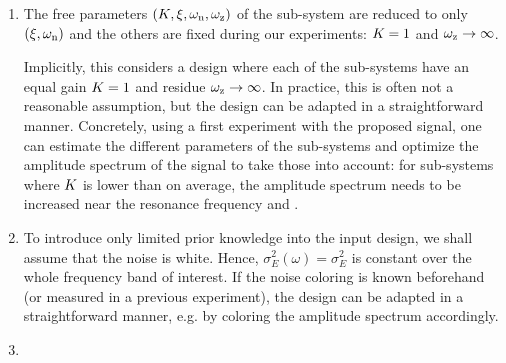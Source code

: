 \documentclass{responseletter}
\begin{document}
\begin{enumerate}
\item {}
\begin{newquote}
 The free parameters $(K_{}, \xi_{}, \omega_{\mathrm{n}}, \omega_{\mathrm{z}})$ of the sub-system are reduced to only $(\xi_{}, \omega_{\mathrm{n}})$ and the others are fixed during our experiments: $K_{} = 1$ and $\omega_{\mathrm{z}} \to \infty$. 
   \begin{remark}{2.10}
   Implicitly, this considers a design where each of the sub-systems have an equal gain $K_{}=1$ and residue $\omega_{\mathrm{z}} \to\infty$.
   In practice, this is often not a reasonable assumption, but the design can be adapted in a straightforward manner.
   Concretely, using a first experiment with the proposed signal, one can estimate the different parameters of the sub-systems and optimize the amplitude spectrum of the signal to take those into account: for sub-systems where $K_{}$ is lower than on average, the amplitude spectrum needs to be increased near the resonance frequency and .
   \end{remark}
\end{newquote}

\item {}
\begin{newquote}
To introduce only limited prior knowledge into the input design, we shall assume that the noise is white.
  Hence, $\sigma^2_E(\omega) = \sigma^2_E$ is constant over the whole frequency band of interest.
  If the noise coloring is known beforehand (or measured in a previous experiment), the design can be adapted in a straightforward manner, e.g. by coloring the amplitude spectrum accordingly.
\end{newquote}

  \item {}
\end{enumerate}
\end{document}

